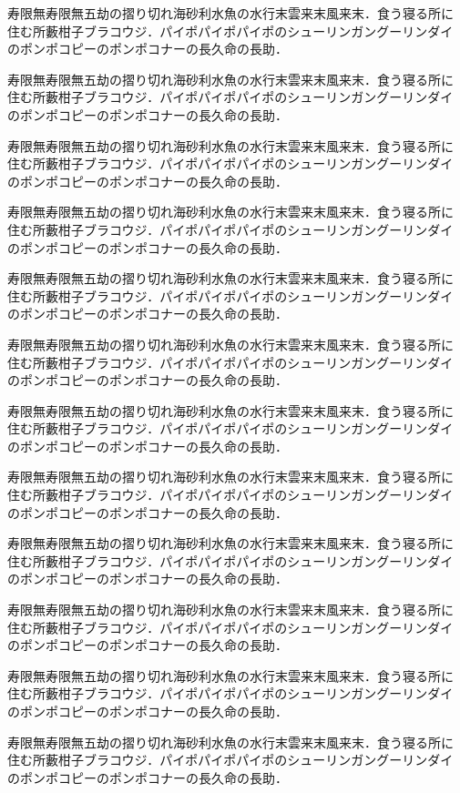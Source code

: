 \documentclass[a4j, 12Q, twocolumn, twoside]{jsarticle}
\begin{document}

寿限無寿限無五劫の摺り切れ海砂利水魚の水行末雲来末風来末．食う寝る所に
住む所藪柑子ブラコウジ．パイポパイポパイポのシューリンガングーリンダイ
のポンポコピーのポンポコナーの長久命の長助．

寿限無寿限無五劫の摺り切れ海砂利水魚の水行末雲来末風来末．食う寝る所に
住む所藪柑子ブラコウジ．パイポパイポパイポのシューリンガングーリンダイ
のポンポコピーのポンポコナーの長久命の長助．

寿限無寿限無五劫の摺り切れ海砂利水魚の水行末雲来末風来末．食う寝る所に
住む所藪柑子ブラコウジ．パイポパイポパイポのシューリンガングーリンダイ
のポンポコピーのポンポコナーの長久命の長助．

寿限無寿限無五劫の摺り切れ海砂利水魚の水行末雲来末風来末．食う寝る所に
住む所藪柑子ブラコウジ．パイポパイポパイポのシューリンガングーリンダイ
のポンポコピーのポンポコナーの長久命の長助．

寿限無寿限無五劫の摺り切れ海砂利水魚の水行末雲来末風来末．食う寝る所に
住む所藪柑子ブラコウジ．パイポパイポパイポのシューリンガングーリンダイ
のポンポコピーのポンポコナーの長久命の長助．

寿限無寿限無五劫の摺り切れ海砂利水魚の水行末雲来末風来末．食う寝る所に
住む所藪柑子ブラコウジ．パイポパイポパイポのシューリンガングーリンダイ
のポンポコピーのポンポコナーの長久命の長助．

寿限無寿限無五劫の摺り切れ海砂利水魚の水行末雲来末風来末．食う寝る所に
住む所藪柑子ブラコウジ．パイポパイポパイポのシューリンガングーリンダイ
のポンポコピーのポンポコナーの長久命の長助．

寿限無寿限無五劫の摺り切れ海砂利水魚の水行末雲来末風来末．食う寝る所に
住む所藪柑子ブラコウジ．パイポパイポパイポのシューリンガングーリンダイ
のポンポコピーのポンポコナーの長久命の長助．

寿限無寿限無五劫の摺り切れ海砂利水魚の水行末雲来末風来末．食う寝る所に
住む所藪柑子ブラコウジ．パイポパイポパイポのシューリンガングーリンダイ
のポンポコピーのポンポコナーの長久命の長助．

寿限無寿限無五劫の摺り切れ海砂利水魚の水行末雲来末風来末．食う寝る所に
住む所藪柑子ブラコウジ．パイポパイポパイポのシューリンガングーリンダイ
のポンポコピーのポンポコナーの長久命の長助．

寿限無寿限無五劫の摺り切れ海砂利水魚の水行末雲来末風来末．食う寝る所に
住む所藪柑子ブラコウジ．パイポパイポパイポのシューリンガングーリンダイ
のポンポコピーのポンポコナーの長久命の長助．

寿限無寿限無五劫の摺り切れ海砂利水魚の水行末雲来末風来末．食う寝る所に
住む所藪柑子ブラコウジ．パイポパイポパイポのシューリンガングーリンダイ
のポンポコピーのポンポコナーの長久命の長助．
\end{document}
